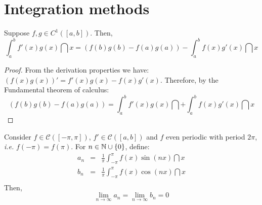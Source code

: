\section{Integration methods}

\begin{theorem}
    Suppose $f, g \in C^1([a,b])$. Then,
    \begin{equation*}
        \int_a^b f'(x)g(x) \dint x = (f(b)g(b) - f(a)g(a)) - \int_a^b f(x) g'(x) \dint x
    \end{equation*}
\end{theorem}

\begin{proof}
    From the derivation properties we have: $(f(x)g(x))' = f'(x)g(x) - f(x)g'(x)$. Therefore, by the Fundamental theorem of calculus:
    \begin{equation*}
        (f(b)g(b) - f(a)g(a)) = \int_a^b f'(x)g(x) \dint + \int_a^b f(x)g'(x) \dint x
    \end{equation*}
\end{proof}

\begin{lemma}
    Consider $f \in \mathcal{C}([-\pi, \pi])$, $f' \in \mathcal{C}([a,b])$ and $f$ even periodic with period $2 \pi$, \emph{i.e.} $f(-\pi) = f(\pi)$. For $n \in \mathbb{N} \cup \{0\}$, define:
    \begin{eqnarray*}
        a_n &=& \frac{1}{\pi} \int_{-\pi}^\pi f(x) \sin(n x) \dint x \\
        b_n &=& \frac{1}{\pi} \int_{-\pi}^\pi f(x) \cos(n x) \dint x \\
    \end{eqnarray*}
    Then,
    \begin{equation*}
        \lim \limits_{n \to \infty} a_n  = \lim \limits_{n \to \infty} b_n  = 0
    \end{equation*}
\end{lemma}

